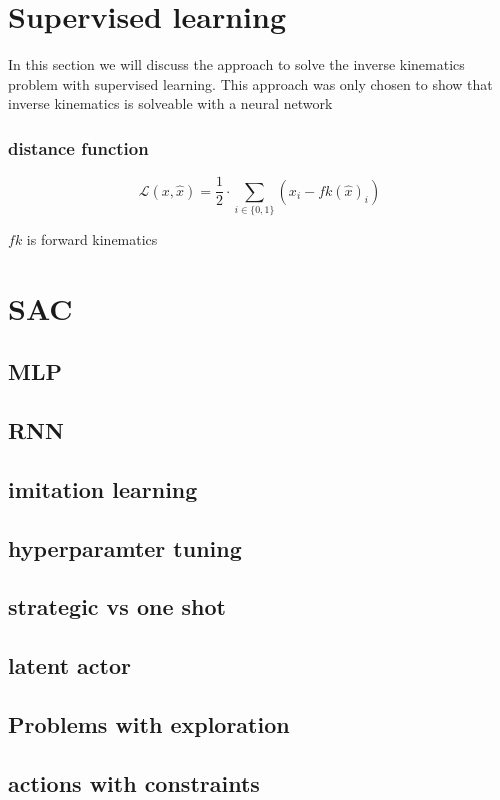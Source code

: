  
\section{Supervised learning}

In this section we will discuss the approach to solve the inverse kinematics problem with supervised learning. This approach was only chosen to show that inverse kinematics is solveable with a neural network


\subsubsection{distance function}
\begin{equation}
    \mathcal{L}(x, \hat{x}) = \frac{1}{2} \cdot \sum_{i\in \{0 ,1\}} (x_i - fk(\hat{x})_i)
\end{equation}

$fk$ is forward kinematics

\section{SAC}

\subsection{MLP}

\subsection{RNN}

\subsection{imitation learning}

\subsection{hyperparamter tuning}

\subsection{strategic vs one shot}


\subsection{latent actor}

\subsection{Problems with exploration}

\subsection{actions with constraints}
